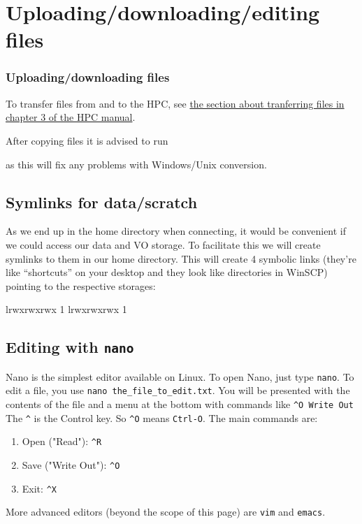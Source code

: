 \chapter{Uploading/downloading/editing files}

\subsection{Uploading/downloading files}

To transfer files from and to the HPC, see
\href{\HPCManualURL#sec:filetranfer}{the section about tranferring files in chapter 3 of the HPC manual}.

\ifwindows

After copying files it is advised to run

\begin{prompt}
\end{prompt}

as this will fix any problems with Windows/Unix conversion.

\fi
\section{Symlinks for data/scratch}

As we end up in the home directory when connecting, it would be convenient if we
could access our data and VO storage. To facilitate this we will create
symlinks to them in our home directory. This will create 4 symbolic links
(they're like ``shortcuts'' on your desktop \ifwindows
and they look like directories in WinSCP\fi)
pointing to the respective storages:

\begin{prompt}
lrwxrwxrwx 1 %
lrwxrwxrwx 1 %
\end{prompt}

\section{Editing with \texttt{nano}}

Nano is the simplest editor available on Linux. To open Nano, just type
\verb|nano|. To edit a file, you use \verb|nano the_file_to_edit.txt|. You will
be presented with the contents of the file and a menu at the bottom with
commands like \verb|^O Write Out| The \verb|^| is the Control key. So \verb|^O| means
\verb|Ctrl-O|. The main commands are:

\begin{enumerate}
\item Open ("Read"): \verb|^R|
\item Save ("Write Out"): \verb|^O|
\item Exit: \verb|^X|
\end{enumerate}

More advanced editors (beyond the scope of this page) are \verb|vim| and \verb|emacs|.

